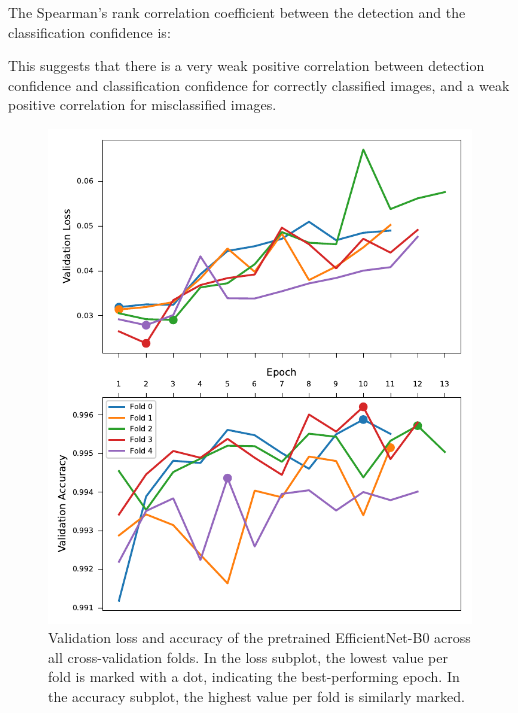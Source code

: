 The Spearman's rank correlation coefficient between the detection and the classification confidence is:



This suggests that there is a very weak positive correlation between detection confidence and classification confidence for correctly classified images, and a weak positive correlation for misclassified images.

\begin{figure}[ht]
\centering
\includegraphics{figures/training_metrics_best_model.pdf}
\caption{
    Validation loss and accuracy of the pretrained EfficientNet-B0 across all cross-validation folds.
    In the loss subplot, the lowest value per fold is marked with a dot, indicating the best-performing epoch.
    In the accuracy subplot, the highest value per fold is similarly marked.
    }
\label{fig:training_metrics_best_model}
\end{figure}



